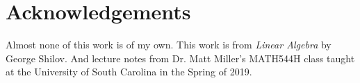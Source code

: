 \section{Acknowledgements}
Almost none of this work is of my own. This work is from \textit{Linear Algebra} by George Shilov. And lecture notes from Dr. Matt Miller's MATH544H class taught at the University of South Carolina in the Spring of 2019.